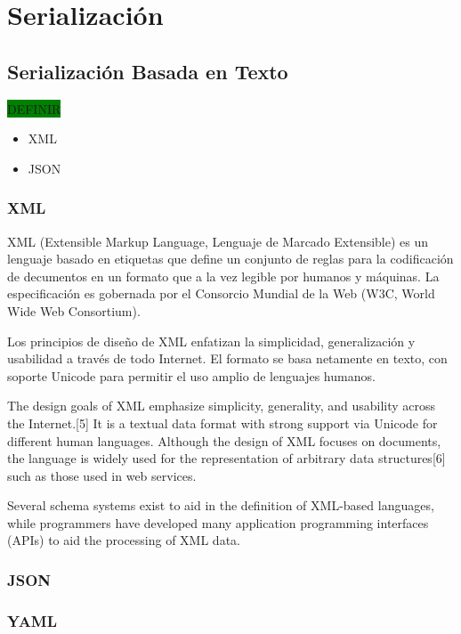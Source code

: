 \section{Serialización}

\subsection{Serialización Basada en Texto}

\colorbox{green}{DEFINIR}

\begin{itemize}
  \item XML
  \item JSON
\end{itemize}

\subsubsection{XML}
XML (Extensible Markup Language, Lenguaje de Marcado Extensible) es un lenguaje basado en etiquetas que define un conjunto de reglas para la codificación de decumentos en un formato que a la vez legible por humanos y máquinas. La especificación es gobernada por el Consorcio Mundial de la Web (W3C, World Wide Web Consortium).

Los principios de diseño de XML enfatizan la simplicidad, generalización y usabilidad a través de todo Internet. El formato se basa netamente en texto, con soporte Unicode para permitir el uso amplio de lenguajes humanos.

The design goals of XML emphasize simplicity, generality, and usability across the Internet.[5] It is a textual data format with strong support via Unicode for different human languages. Although the design of XML focuses on documents, the language is widely used for the representation of arbitrary data structures[6] such as those used in web services.

Several schema systems exist to aid in the definition of XML-based languages, while programmers have developed many application programming interfaces (APIs) to aid the processing of XML data.

\subsubsection{JSON}
\subsubsection{YAML}

